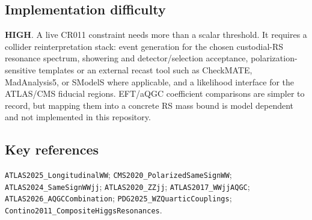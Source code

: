 \subsection*{Implementation difficulty}
\textbf{HIGH}.  A live CR011 constraint needs more than a scalar threshold.  It
requires a collider reinterpretation stack: event generation for the chosen
custodial-RS resonance spectrum, showering and detector/selection acceptance,
polarization-sensitive templates or an external recast tool such as CheckMATE,
MadAnalysis5, or SModelS where applicable, and a likelihood interface for the
ATLAS/CMS fiducial regions.  EFT/aQGC coefficient comparisons are simpler to
record, but mapping them into a concrete RS mass bound is model dependent and
not implemented in this repository.

\subsection*{Key references}
\texttt{ATLAS2025\_LongitudinalWW}; \texttt{CMS2020\_PolarizedSameSignWW};
\texttt{ATLAS2024\_SameSignWWjj}; \texttt{ATLAS2020\_ZZjj};
\texttt{ATLAS2017\_WWjjAQGC}; \texttt{ATLAS2026\_AQGCCombination};
\texttt{PDG2025\_WZQuarticCouplings};
\texttt{Contino2011\_CompositeHiggsResonances}.
